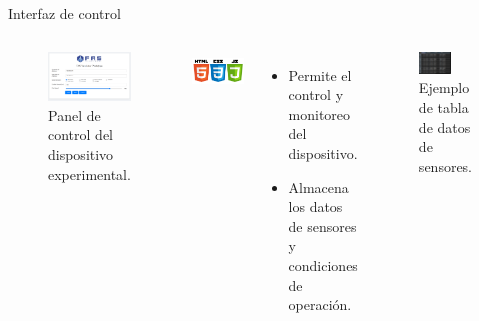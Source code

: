 \begin{frame}{Interfaz de control}
    \begin{columns}
    \centering
        \begin{block}{}
            \begin{figure}[ht!]
                \centering
                \includegraphics[width=\textwidth]{dump/web.png}
                \caption{Panel de control del dispositivo experimental.}
            \end{figure}
        \end{block}
            \includegraphics[height=0.14\textwidth]{dump/stack.png}
        \begin{itemize}
            \item Permite el control y monitoreo del dispositivo.
            \item Almacena los datos de sensores y condiciones de operación.
        \end{itemize}
        \begin{block}{}
            \begin{figure}[ht!]
                \centering
                \includegraphics[width=0.6\textwidth]{dump/table.png}
                \caption{Ejemplo de tabla de datos de sensores.}
            \end{figure}
        \end{block}       
    \end{columns}
\end{frame}

